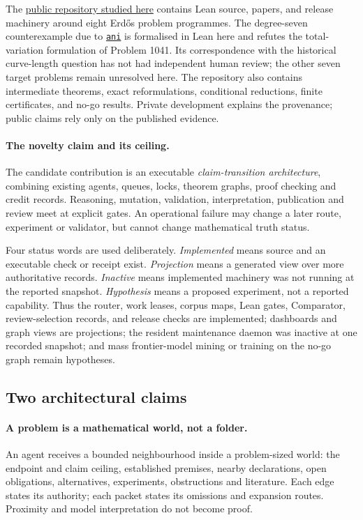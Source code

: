 \documentclass[10pt]{article}
\newcommand{\repobase}{https://github.com/wcook04/plectis-erdos}
\begin{document}
The \href{\repobase}{public repository studied here} contains Lean source,
papers, and release machinery around eight Erd\H{o}s problem programmes. The
degree-seven counterexample due to
\href{https://www.erdosproblems.com/forum/thread/1041\#post-8861}{\texttt{ani}}
is formalised in Lean here and refutes the total-variation formulation of
Problem 1041. Its correspondence with the historical curve-length question has not had
independent human review; the other seven target problems remain unresolved here. The repository also contains
intermediate theorems, exact reformulations, conditional reductions, finite
certificates, and no-go results. Private development explains the provenance;
public claims rely only on the published evidence.

\paragraph{The novelty claim and its ceiling.}
The candidate contribution is an executable \emph{claim-transition architecture},
combining existing agents, queues, locks, theorem graphs, proof checking and
credit records. Reasoning, mutation, validation, interpretation, publication and
review meet at explicit gates. An operational failure may change a later route,
experiment or validator, but cannot change mathematical truth status.

Four status words are used deliberately. \emph{Implemented} means source and
an executable check or receipt exist. \emph{Projection} means a generated view
over more authoritative records. \emph{Inactive} means implemented machinery
was not running at the reported snapshot. \emph{Hypothesis} means a proposed
experiment, not a reported capability. Thus the router, work leases, corpus
maps, Lean gates, Comparator, review-selection records, and release checks are
implemented; dashboards and graph views are projections; the resident
maintenance daemon was inactive at one recorded snapshot; and mass
frontier-model mining or training on the no-go graph remain hypotheses.

\subsection{Two architectural claims}

\paragraph{A problem is a mathematical world, not a folder.}
An agent receives a bounded neighbourhood inside a problem-sized world: the
endpoint and claim ceiling, established premises, nearby declarations, open
obligations, alternatives, experiments, obstructions and literature. Each edge
states its authority; each packet states its omissions and expansion routes.
Proximity and model interpretation do not become proof.
\end{document}
